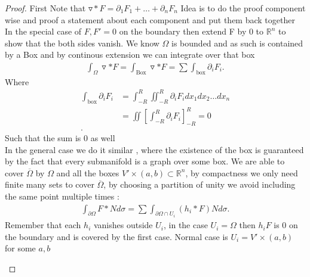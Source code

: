 \begin{proof}
 First Note that $\triangledown * F = \partial_1 F_1 + \ldots  + \partial_n F_n$ 
 Idea is to do the proof component wise and proof a statement about each component and put them back together\\[1ex]
 In the special case of $F,F' =0$ on the boundary then extend F by 0 to $\mathbb{R}^{n} $ to show that the both sides vanish. We know $\Omega $ is bounded and as such is contained by a Box and by continous extension we can integrate over that box 
 \begin{align*}
   \int_\Omega  \triangledown * F = \int_{\text{Box}} \triangledown * F =  \sum \int_{\text{box}} \partial_i F_i 
 .\end{align*}
 Where 
 \begin{align*}
   \int_{\text{box}} \partial_i F_i &= \int_{-R}^{R}\iint_{-R}^{R}   \partial_i F_i dx_1 dx_2 \ldots  dx_n \\
                                    &= \iint [\int_{-R}^{R} \partial_i F_i ]_{-R}^{R}   = 0\\ 
 .\end{align*}
 Such that the sum is 0 as well \\[1ex]
 In the general case we do it similar , where the existence of the box is guaranteed by the fact that every submanifold is a graph over some box.
 We are able to cover $\overline{\Omega } $ by $\Omega $ and all the boxes $V' \times  (a,b) \subset  \mathbb{R}^{n}  $, by compactness we only need finite many 
 sets to cover $\overline{\Omega } $, by choosing a partition of unity we avoid including the same point multiple times : 
 \begin{align*}
   \int_{\partial \Omega } F*N d \sigma  = \sum \int_{\partial \Omega \cap U_i } (h_i * F) N d \sigma  
 .\end{align*}
 Remember that each $h_i$ vanishes outside $U_i$, in the case $U_i = \Omega $ then $h_i F$ is 0 on the boundary and is covered by the first case.
 Normal case is $U_i = V' \times  (a,b)$ for some $a,b$
 \begin{figure}[H]
 \begin{center}

\end{center}
\end{figure}
\end{proof}
